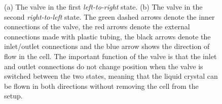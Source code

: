 \begin{figure}
\begin{center}
\end{center}
\caption[Workings of two state valve]{\label{fig:valve_states}(a) The valve in the first \textit{left-to-right} state. (b) The valve in the second \textit{right-to-left} state. The green dashed arrows denote the inner connections of the valve, the red arrows denote the external connections made with plastic tubing, the black arrows denote the inlet/outlet connections and the blue arrow shows the direction of flow in the cell. The important function of the valve is that the inlet and outlet connections do not change position when the valve is switched between the two states, meaning that the liquid crystal can be flown in both directions without removing the cell from the setup.}
\end{figure}

